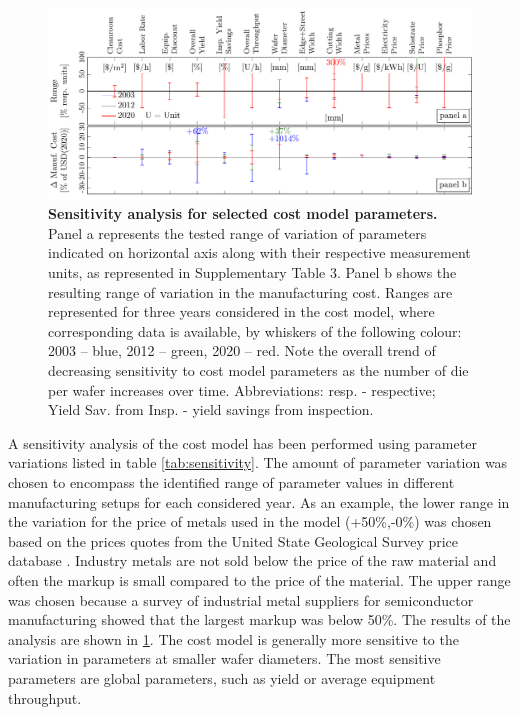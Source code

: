 \documentclass[parskip=full]{article}
\begin{document}
\begin{figure}[ht!]
	\centering
    \includegraphics[width=\textwidth]{./figures/costmodel_sensitivity.pdf}
	\caption{\textbf{Sensitivity analysis for selected cost model parameters.} Panel a represents the tested range of variation of parameters indicated on horizontal axis along with their respective measurement units, as represented in Supplementary Table 3. Panel b shows the resulting range of variation in the manufacturing cost. Ranges are represented for three years considered in the cost model, where corresponding data is available, by whiskers of the following colour: 2003 – blue, 2012 – green, 2020 – red. Note the overall trend of decreasing sensitivity to cost model parameters as the number of die per wafer increases over time. Abbreviations: resp. - respective; Yield Sav. from Insp. - yield savings from inspection.}
	\label{fig:sensitivity}
\end{figure}

A sensitivity analysis of the cost model has been performed using parameter variations listed in table \cref{tab:sensitivity}. The amount of parameter variation was chosen to encompass the identified range of parameter values in different manufacturing setups for each considered year. As an example, the lower range in the variation for the price of metals used in the model (+50\%,-0\%) was chosen based on the prices quotes from the United State Geological Survey price database \cite{usgeoprices}. Industry metals are not sold below the price of the raw material and often the markup is small compared to the price of the material. The upper range was chosen because a survey of industrial metal suppliers for semiconductor manufacturing showed that the largest markup was below 50\%. The results of the analysis are shown in  \cref{fig:sensitivity}. The cost model is generally more sensitive to the variation in parameters at smaller wafer diameters. The most sensitive parameters are global parameters, such as yield or average equipment throughput.
\end{document}
